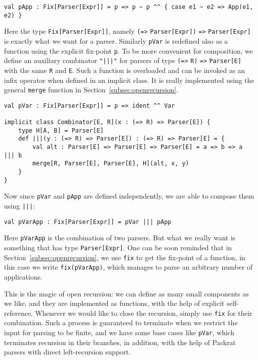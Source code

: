 \begin{lstlisting}
val pApp : Fix[Parser[Expr]] = p => p ~ p ^^ { case e1 ~ e2 => App(e1, e2) }
\end{lstlisting}
Here the type \lstinline{Fix[Parser[Expr]]}, namely \lstinline{(=>} \lstinline{Parser[Expr])} \lstinline{=>} \lstinline{Parser[Expr]} is exactly what we want for a parser. Similarly \lstinline{pVar} is redefined also as a function using the explicit fix-point \lstinline{p}. To be more convenient for composition, we define an auxiliary combinator \lstinline{"|||"} for parsers of type \lstinline{(=>} \lstinline{R)} \lstinline{=>} \lstinline{Parser[E]} with the same \lstinline{R} and \lstinline{E}. Such a function is overloaded and can be invoked as an infix operator when defined in an implicit class. It is really implemented using the general \lstinline{merge} function in Section~\ref{subsec:openrecursion}.
\begin{lstlisting}
val pVar : Fix[Parser[Expr]] = p => ident ^^ Var

implicit class Combinator[E, R](x : (=> R) => Parser[E]) {
    type H[A, B] = Parser[E]
    def |||(y : (=> R) => Parser[E]) : (=> R) => Parser[E] = {
        val alt : Parser[E] => Parser[E] => Parser[E] = a => b => a ||| b
        merge[R, Parser[E], Parser[E], H](alt, x, y)
    }
}
\end{lstlisting}
Now since \lstinline{pVar} and \lstinline{pApp} are defined independently, we are able to compose them using \lstinline{|||}:
\begin{lstlisting}
val pVarApp : Fix[Parser[Expr]] = pVar ||| pApp
\end{lstlisting}
Here \lstinline{pVarApp} is the combination of two parsers. But what we really want is something that has type \lstinline{Parser[Expr]}. One can be soon reminded that in Section~\ref{subsec:openrecursion}, we use \lstinline{fix} to get the fix-point of a function, in this case we write \lstinline{fix(pVarApp)}, which manages to parse an arbitrary number of applications.

This is the magic of open recursion: we can define as many small components as we like, and they are implemented as functions, with the help of explicit self-reference. Whenever we would like to close the recursion, simply use \lstinline{fix} for their combination. Such a process is guaranteed to terminate when we restrict the input for parsing to be finite, and we have some base cases like \lstinline{pVar}, which terminates recursion in their branches, in addition, with the help of Packrat parsers with direct left-recursion support.


